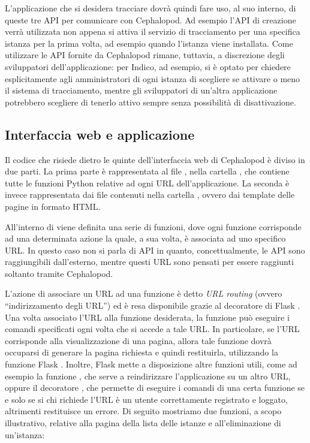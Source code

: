             L'applicazione che si desidera tracciare dovrà quindi fare uso, al suo interno, di queste tre \ac{API} per comunicare con Cephalopod. Ad esempio l'\ac{API} di creazione verrà utilizzata non appena si attiva il servizio di tracciamento per una specifica istanza per la prima volta, ad esempio quando l'istanza viene installata. Come utilizzare le \ac{API} fornite da Cephalopod rimane, tuttavia, a discrezione degli sviluppatori dell'applicazione: per Indico, ad esempio, si è optato per chiedere esplicitamente agli amministratori di ogni istanza di scegliere se attivare o meno il sistema di tracciamento, mentre gli sviluppatori di un'altra applicazione potrebbero scegliere di tenerlo attivo sempre senza possibilità di disattivazione.
        
        \subsection{Interfaccia web e applicazione} \label{subsec:it;di;interfaccia_web_applicazione}
        
            Il codice che risiede dietro le quinte dell'interfaccia web di Cephalopod è diviso in due parti. La prima parte è rappresentata al file , nella cartella , che contiene tutte le funzioni Python relative ad ogni \ac{URL} dell'applicazione. La seconda è invece rappresentata dai file contenuti nella cartella , ovvero dai template delle pagine in formato \ac{HTML}.
            
            All'interno di  viene definita una serie di funzioni, dove ogni funzione corrisponde ad una determinata azione la quale, a sua volta, è associata ad uno specifico \ac{URL}. In questo caso non si parla di \ac{API} in quanto, concettualmente, le \ac{API} sono raggiungibili dall'esterno, mentre questi \ac{URL} sono pensati per essere raggiunti soltanto tramite Cephalopod.
            
            L'azione di associare un \ac{URL} ad una funzione è detto \textit{\ac{URL} routing} (ovvero ``indirizzamento degli \ac{URL}'') ed è resa disponibile grazie al decoratore di Flask . Una volta associato l'\ac{URL} alla funzione desiderata, la funzione può eseguire i comandi specificati ogni volta che si accede a tale \ac{URL}. In particolare, se l'\ac{URL} corrisponde alla visualizzazione di una pagina, allora tale funzione dovrà occuparsi di generare la pagina richiesta e quindi restituirla, utilizzando la funzione Flask . Inoltre, Flask mette a disposizione altre funzioni utili, come ad esempio la funzione , che serve a reindirizzare l'applicazione su un altro \ac{URL}, oppure il decoratore , che permette di eseguire i comandi di una certa funzione se e solo se si chi richiede l'\ac{URL} è un utente correttamente registrato e loggato, altrimenti restituisce un errore. Di seguito mostriamo due funzioni, a scopo illustrativo, relative alla pagina della lista delle istanze e all'eliminazione di un'istanza:
            
